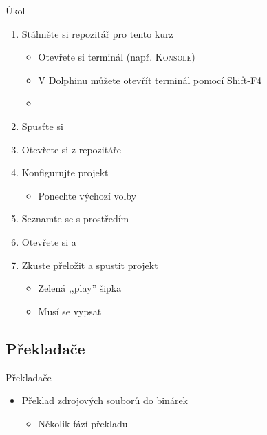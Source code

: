 \begin{frame}{Úkol}

  \begin{enumerate}
    \item Stáhněte si repozitář pro tento kurz
    \begin{itemize}
      \item Otevřete si terminál (např. \textsc{Konsole})
      \item V Dolphinu můžete otevřít terminál pomocí Shift-F4
      \item {}
    \end{itemize}

    \item Spusťte si \qtc
    \item Otevřete si  z repozitáře

    \item Konfigurujte projekt
    \begin{itemize}
      \item Ponechte výchozí volby
    \end{itemize}

    \item Seznamte se s prostředím
    \item Otevřete si  a 

    \item Zkuste přeložit a spustit projekt
    \begin{itemize}
      \item Zelená ,,play'' šipka
      \item Musí se vypsat 
    \end{itemize}
  \end{enumerate}

\end{frame}

\subsection*{Překladače}
\frame{\subsectionpage}

\begin{frame}{Překladače}

  \begin{itemize}
    \item Překlad zdrojových souborů do binárek
    \begin{itemize}
      \item Několik fází překladu
    \end{itemize}

  \end{itemize}

  \bigskip

  \begin{center}
    
  \end{center}

\end{frame}


